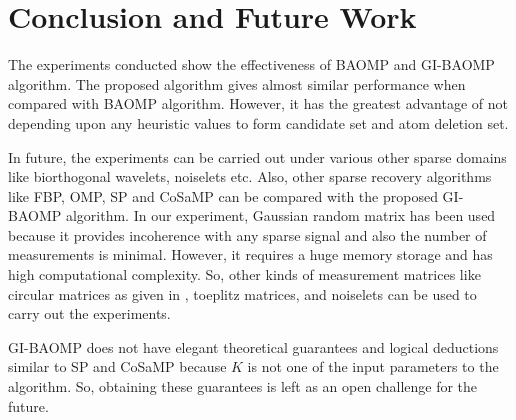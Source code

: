 \documentclass[11pt,conference]{IEEEtran}
\begin{document}
\section{Conclusion and Future Work}
\label{sec:last}
The experiments conducted show the effectiveness of BAOMP and GI-BAOMP algorithm. The proposed algorithm gives almost similar performance when compared with BAOMP algorithm. However, it has the greatest advantage of not depending upon any heuristic values to form candidate set  and atom deletion set. 

\par In future, the experiments can be carried out under various other sparse domains like biorthogonal wavelets, noiselets etc. Also, other sparse recovery algorithms like FBP, OMP, SP and CoSaMP can be compared with the proposed GI-BAOMP algorithm. In our experiment, Gaussian random matrix has been used because it provides incoherence with any sparse signal and also the number of measurements is minimal. However, it requires a huge memory storage and has high computational complexity. So, other kinds of measurement matrices like circular matrices as given in \cite{circulant}, toeplitz matrices, and noiselets can be used to carry out the experiments.  

\par GI-BAOMP does not have elegant theoretical guarantees and logical deductions similar to SP\cite{sp} and CoSaMP \cite{cosamp} because $K$ is not one of the input parameters to the algorithm. So, obtaining these guarantees is left as an open challenge for the future.
\end{document}

